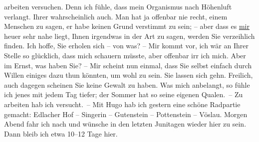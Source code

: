 \begin{ledgroupsized}[t]{13cm}
               arbeiten versuchen. Denn ich fühle, dass mein Organismus nach Höhenluft verlangt.
               Ihrer wahrscheinlich auch. Man hat ja offenbar nie recht, einem Menschen zu sagen, er
               habe keinen Grund verstimmt zu sein; – aber dass es \uline{mir} heuer sehr nahe liegt, Ihnen irgendwas in der Art zu sagen, werden Sie
               verzeihlich finden. Ich hoffe, Sie erholen sich – von was? – Mir kommt vor, ich wär
               an Ihrer Stelle so glücklich, dass mich schauern müsste, aber offenbar irr ich mich.
               Aber im Ernst, was haben Sie? – Mir scheint nun einmal, dass Sie selbst einfach durch
               Willen einiges dazu thun könnten, um wohl zu sein. Sie lassen sich gehn. Freilich,
               auch dagegen scheinen Sie keine Gewalt zu haben.\pend
           \pstart
           Was mich anbelangt, so fühle ich jenes \label{K_L00928-1v}\label{K_L00928-1h} mit {\pb}jedem Tag tiefer; der Sommer
               hat so seine eigenen Qualen. – Zu arbeiten hab ich versucht. – Mit Hugo hab ich gestern eine schöne Radpartie
               gemacht: Edlacher Hof – Singerin – Gutenstein – Pottenstein – Vöslau.\pend
           \pstart
           Morgen Abend fahr ich nach \label{K_L00928-2v}\label{K_L00928-2h} und wünsche in den
               letzten Junitagen wieder hier zu sein. Dann bleib ich etwa 10–12 Tage
               hier.\pend
           \pstart

\end{ledgroupsized}
